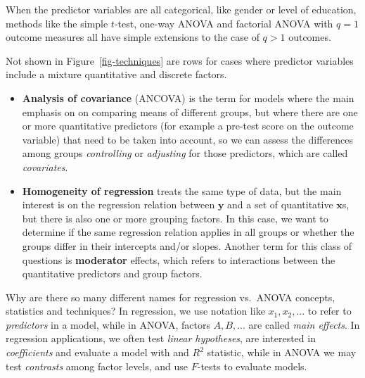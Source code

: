 \documentclass[
  letterpaper,
  10pt,
  krantz2]{krantz}
\begin{document}
{When the predictor variables are all categorical, like gender or level
of education, methods like the simple \(t\)-test, one-way ANOVA and
factorial ANOVA with \(q=1\) outcome measures all have simple extensions
to the case of \(q>1\) outcomes.

Not shown in Figure~\ref{fig-techniques} are rows for cases where
predictor variables include a mixture quantitative and discrete factors.

\begin{itemize}
\item
  \textbf{Analysis of covariance} (ANCOVA) is the term for models where
  the main emphasis on on comparing means of different groups, but where
  there are one or more quantitative predictors (for example a pre-test
  score on the outcome variable) that need to be taken into account, so
  we can assess the differences among groups \emph{controlling} or
  \emph{adjusting} for those predictors, which are called
  \emph{covariates}.
\item
  \textbf{Homogeneity of regression} treats the same type of data, but
  the main interest is on the regression relation between \(\mathbf{y}\)
  and a set of quantitative \(\mathbf{x}\)s, but there is also one or
  more grouping factors. In this case, we want to determine if the same
  regression relation applies in all groups or whether the groups differ
  in their intercepts and/or slopes. Another term for this class of
  questions is \textbf{moderator} effects, which refers to interactions
  between the quantitative predictors and group factors.
\end{itemize}

\begin{tcolorbox}[enhanced jigsaw, colback=white, titlerule=0mm, toprule=.15mm, opacityback=0, leftrule=.75mm, opacitybacktitle=0.6, left=2mm, arc=.35mm, colframe=quarto-callout-note-color-frame, breakable, bottomtitle=1mm, toptitle=1mm, title=\textcolor{quarto-callout-note-color}{\faInfo}\hspace{0.5em}{History Corner}, rightrule=.15mm, bottomrule=.15mm, coltitle=black, colbacktitle=quarto-callout-note-color!10!white]

Why are there so many different names for regression vs.~ANOVA concepts,
statistics and techniques? In regression, we use notation like
\(x_1, x_2, ...\) to refer to \emph{predictors} in a model, while in
ANOVA, factors \(A, B, ...\) are called \emph{main effects}. In
regression applications, we often test \emph{linear hypotheses}, are
interested in \emph{coefficients} and evaluate a model with and \(R^2\)
statistic, while in ANOVA we may test \emph{contrasts} among factor
levels, and use \(F\)-tests to evaluate models.


\end{tcolorbox}}
\end{document}
